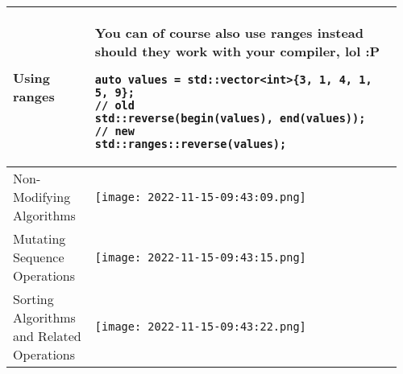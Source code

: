 \documentclass[main.tex,fontsize=8pt,paper=a4,paper=portrait,DIV=calc,]{scrartcl}
\begin{document}
\begin{table}[ht!]
\begin{tabular}{|m{0.2\linewidth}|m{0.755\linewidth}|}
\hline
Using ranges & 
You can of course also use ranges instead should they work with your compiler, lol :P\newline
\begin{lstlisting}
auto values = std::vector<int>{3, 1, 4, 1, 5, 9};
// old
std::reverse(begin(values), end(values));
// new
std::ranges::reverse(values);
\end{lstlisting}\\
\hline
Non-Modifying Algorithms & 
\vspace{2mm}
\texttt{[image: 2022-11-15-09:43:09.png]}\\
\hline
Mutating Sequence Operations & 
\vspace{2mm}
\texttt{[image: 2022-11-15-09:43:15.png]}\\
\hline
Sorting Algorithms and Related Operations & 
\vspace{2mm}
\texttt{[image: 2022-11-15-09:43:22.png]}\\
\hline
\end{tabular}
\end{table}
\pagebreak
\end{document}
